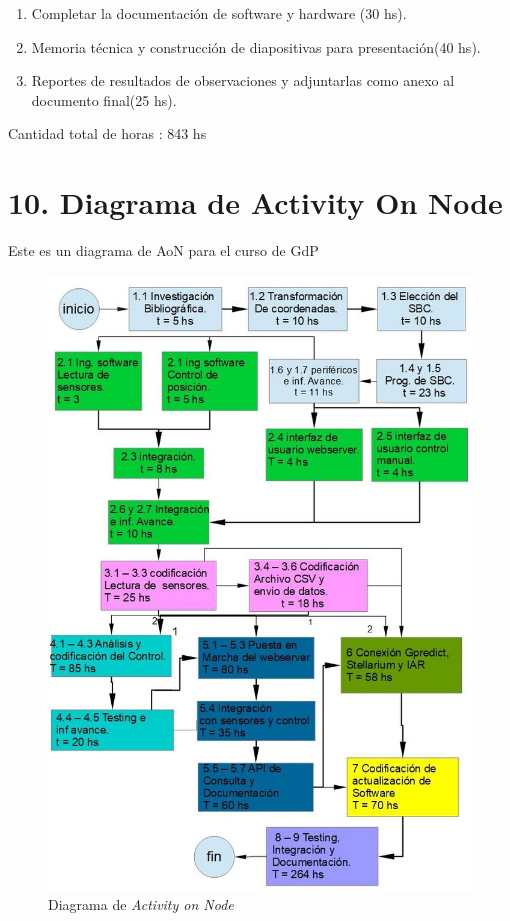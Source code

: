 \documentclass[11pt, %
codirector, %
]{charter}
\begin{document}
\begin{enumerate}
	\begin{enumerate}
	\item Completar la documentación de software y hardware (30 hs).
	\item Memoria técnica y construcción de diapositivas para presentación(40 hs). 
	\item Reportes de resultados de observaciones y adjuntarlas como anexo al documento final(25 hs). 
	\end{enumerate}
	

\end{enumerate}
	
Cantidad total de horas :  843 hs  



\section{10. Diagrama de Activity On Node}
\label{sec:AoN}

Este es un diagrama de AoN para el curso de GdP
\begin{figure}[p]
\centering
\includegraphics[width = \textwidth]{./Figuras/AonGantt/ActivityOnNode.jpg}
\caption{Diagrama de \textit{Activity on Node}}
\label{fig:AoN}
\end{figure}
\end{document}
